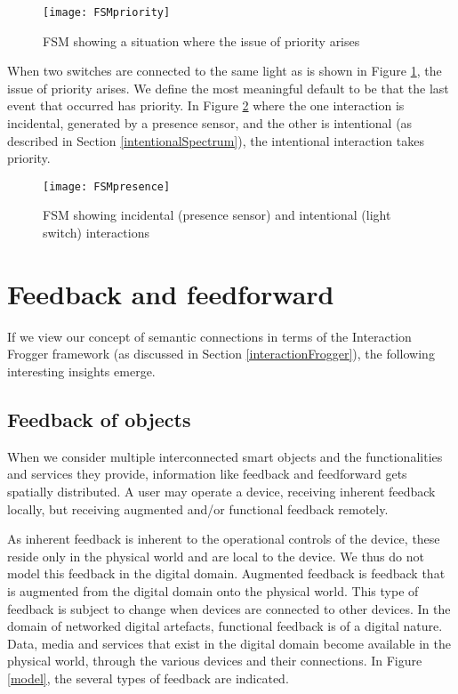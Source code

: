 \begin{figure}
\centerline{\texttt{[image: FSMpriority]}}
\caption{FSM showing a situation where the issue of priority arises} %
\label{FSMpriority}
\end{figure}

When two switches are connected to the same light as is shown in Figure \ref{FSMpriority}, the issue of priority arises. We define the most meaningful default to be that the last event that occurred has priority. In Figure \ref{FSMpresence} where the one interaction is incidental, generated by a presence sensor, and the other is intentional (as described in Section \ref{intentionalSpectrum}), the intentional interaction takes priority.

\begin{figure}
\centerline{\texttt{[image: FSMpresence]}}
\caption{FSM showing incidental (presence sensor) and intentional (light switch) interactions}
\label{FSMpresence}
\end{figure}


\section{Feedback and feedforward}
\label{feedbackforward}
If we view our concept of semantic connections in terms of the Interaction Frogger framework (as discussed in Section \ref{interactionFrogger}), the following interesting insights emerge.

\subsection{Feedback of objects}
When we consider multiple interconnected smart objects and the functionalities and services they provide, information like feedback and feedforward gets spatially distributed. A user may operate a device, receiving inherent feedback locally, but receiving augmented and/or functional feedback remotely. 

As inherent feedback is inherent to the operational controls of the device, these reside only in the physical world and are local to the device. We thus do not model this feedback in the digital domain. Augmented feedback is feedback that is augmented from the digital domain onto the physical world. This type of feedback is subject to change when devices are connected to other devices. In the domain of networked digital artefacts, functional feedback is of a digital nature. Data, media and services that exist in the digital domain become available in the physical world, through the various devices and their connections. In Figure \ref{model}, the several types of feedback are indicated. 

